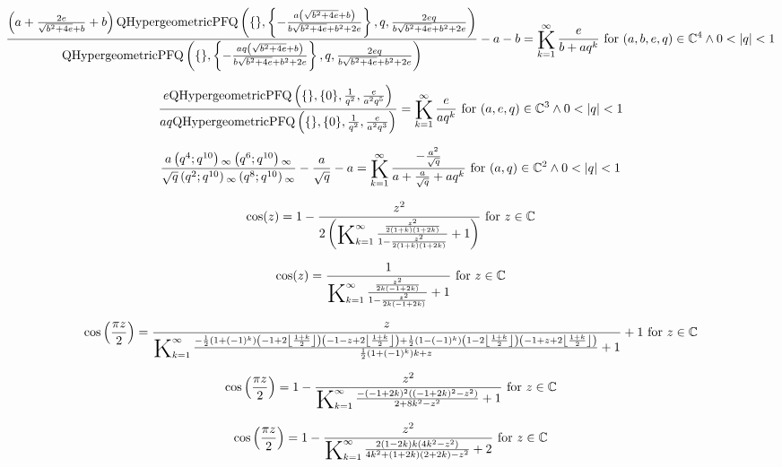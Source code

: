 \documentclass{article}
\newcommand{\bigK}{\mathop{\raisebox{-5pt}{\huge K}}}
\begin{document}
\[\frac{\left(a+\frac{2 e}{\sqrt{b^2+4 e}+b}+b\right) \text{QHypergeometricPFQ}\left(\{\},\left\{-\frac{a \left(\sqrt{b^2+4 e}+b\right)}{b \sqrt{b^2+4 e}+b^2+2 e}\right\},q,\frac{2 e q}{b \sqrt{b^2+4 e}+b^2+2 e}\right)}{\text{QHypergeometricPFQ}\left(\{\},\left\{-\frac{a q \left(\sqrt{b^2+4 e}+b\right)}{b \sqrt{b^2+4 e}+b^2+2 e}\right\},q,\frac{2 e q}{b \sqrt{b^2+4 e}+b^2+2 e}\right)}-a-b=\bigK_{k=1}^{\infty}\frac{e}{b+a q^k}\text{ for }(a,b,e,q)\in \mathbb{C}^4\land 0<\left| q\right| <1\] 

\[\frac{e \text{QHypergeometricPFQ}\left(\{\},\{0\},\frac{1}{q^2},\frac{e}{a^2 q^5}\right)}{a q \text{QHypergeometricPFQ}\left(\{\},\{0\},\frac{1}{q^2},\frac{e}{a^2 q^3}\right)}=\bigK_{k=1}^{\infty}\frac{e}{a q^k}\text{ for }(a,e,q)\in \mathbb{C}^3\land 0<\left| q\right| <1\] 

\[\frac{a \left(q^4;q^{10}\right){}_{\infty } \left(q^6;q^{10}\right){}_{\infty }}{\sqrt{q} \left(q^2;q^{10}\right){}_{\infty } \left(q^8;q^{10}\right){}_{\infty }}-\frac{a}{\sqrt{q}}-a=\bigK_{k=1}^{\infty}\frac{-\frac{a^2}{\sqrt{q}}}{a+\frac{a}{\sqrt{q}}+a q^k}\text{ for }(a,q)\in \mathbb{C}^2\land 0<\left| q\right| <1\] 

\[\cos (z)=1-\frac{z^2}{2 \left(\bigK_{k=1}^{\infty}\frac{\frac{z^2}{2 (1+k) (1+2 k)}}{1-\frac{z^2}{2 (1+k) (1+2 k)}}+1\right)}\text{ for }z\in \mathbb{C}\] 

\[\cos (z)=\frac{1}{\bigK_{k=1}^{\infty}\frac{\frac{z^2}{2 k (-1+2 k)}}{1-\frac{z^2}{2 k (-1+2 k)}}+1}\text{ for }z\in \mathbb{C}\] 

\[\cos \left(\frac{\pi  z}{2}\right)=\frac{z}{\bigK_{k=1}^{\infty}\frac{-\frac{1}{2} \left(1+(-1)^k\right) \left(-1+2 \left\lfloor \frac{1+k}{2}\right\rfloor \right) \left(-1-z+2 \left\lfloor \frac{1+k}{2}\right\rfloor \right)+\frac{1}{2} \left(1-(-1)^k\right) \left(1-2 \left\lfloor \frac{1+k}{2}\right\rfloor \right) \left(-1+z+2 \left\lfloor \frac{1+k}{2}\right\rfloor \right)}{\frac{1}{2} \left(1+(-1)^k\right) k+z}+1}+1\text{ for }z\in \mathbb{C}\] 

\[\cos \left(\frac{\pi  z}{2}\right)=1-\frac{z^2}{\bigK_{k=1}^{\infty}\frac{-(-1+2 k)^2 \left((-1+2 k)^2-z^2\right)}{2+8 k^2-z^2}+1}\text{ for }z\in \mathbb{C}\] 

\[\cos \left(\frac{\pi  z}{2}\right)=1-\frac{z^2}{\bigK_{k=1}^{\infty}\frac{2 (1-2 k) k \left(4 k^2-z^2\right)}{4 k^2+(1+2 k) (2+2 k)-z^2}+2}\text{ for }z\in \mathbb{C}\] 
\end{document}
